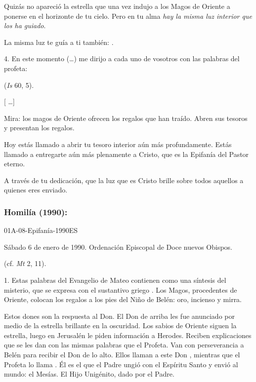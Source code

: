 \begin{body}
	Quizás no apareció la estrella que una vez indujo a los Magos de Oriente a ponerse en el horizonte de tu cielo. Pero en tu alma \emph{hay la misma luz interior que los ha guiado}.

	La misma luz te guía a ti también: .

	4. En este momento (\ldots{}) me dirijo a cada uno de vosotros con las palabras del profeta:

	 (\emph{Is} 60, 5).

	{[} \ldots{}{]}

	Mira: los magos de Oriente ofrecen los regalos que han traído. Abren sus tesoros y presentan los regalos.

	Hoy estás llamado a abrir tu tesoro interior aún más profundamente. Estás llamado a entregarte aún más plenamente a Cristo, que es la Epifanía del Pastor eterno.

	A través de tu dedicación, que la luz que es Cristo brille sobre todos aquellos a quienes eres enviado.

	\subsubsection{Homilía (1990):} 01A-08-Epifanía-1990ES

	Sábado 6 de enero de 1990. Ordenación Episcopal de Doce nuevos Obispos.

	 (cf. \emph{Mt} 2, 11).

	1. Estas palabras del Evangelio de Mateo contienen como una síntesis del misterio, que se expresa con el sustantivo griego . Los Magos, procedentes de Oriente, colocan los regalos a los pies del Niño de Belén: oro, incienso y mirra.

	Estos dones son la respuesta al Don. El Don de arriba les fue anunciado por medio de la estrella brillante en la oscuridad. Los sabios de Oriente siguen la estrella, luego en Jerusalén le piden información a Herodes. Reciben explicaciones que se les dan con las mismas palabras que el Profeta. Van con perseverancia a Belén para recibir el Don de lo alto. Ellos llaman a este Don , mientras que el Profeta lo llama . Él es el que el Padre ungió con el Espíritu Santo y envió al mundo: el Mesías. El Hijo Unigénito, dado por el Padre.


\end{body}
